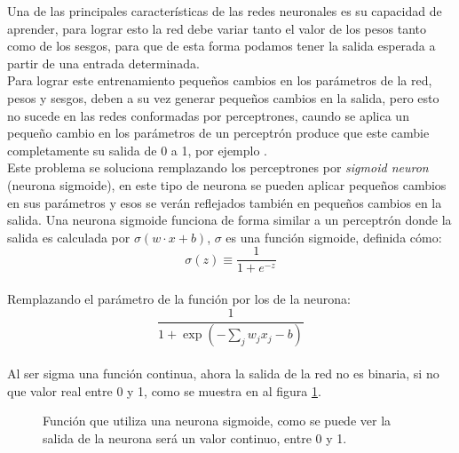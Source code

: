 \documentclass{iccmemoria}
\begin{document}
Una de las principales características de las redes neuronales es su capacidad de aprender, para lograr esto la red debe variar tanto el valor de los pesos tanto como de los sesgos, para que de esta forma podamos tener la salida esperada a partir de una entrada determinada.\\

Para lograr este entrenamiento pequeños cambios en los parámetros de la red, pesos y sesgos, deben a su vez generar pequeños cambios en la salida, pero esto no sucede en las redes conformadas por perceptrones, caundo se aplica un pequeño cambio en los parámetros de un perceptrón produce que este cambie completamente su salida de 0 a 1, por ejemplo \cite{neuralNet}.\\

Este problema se soluciona remplazando los perceptrones por \emph{sigmoid neuron} (neurona sigmoide), en este tipo de neurona se pueden aplicar pequeños cambios en sus parámetros y esos se verán reflejados también en pequeños cambios en la salida. Una neurona sigmoide funciona de forma similar a un perceptrón donde la salida es calculada por $ \sigma(w \cdot x + b)$, $\sigma$ es una función sigmoide, definida cómo:\\

\begin{equation}
	\sigma(z) \equiv \frac{1}{1+e^{-z}}
\end{equation}\\

Remplazando el parámetro de la función por los de la neurona:\\

\begin{equation} 
  \frac{1}{1+\exp(-\sum_j w_j x_j-b)}
\end{equation}\\

Al ser sigma una función continua, ahora la salida de la red no es binaria, si no que valor real entre 0 y 1, como se muestra en al figura \ref{fig:sigmoid}.\\

\begin{figure}[H]
  \centering
  \begin{small}
  
  \end{small}
  \caption[Función sigmoide.]{Función que utiliza una neurona sigmoide, como se puede ver la salida de la neurona será un valor continuo, entre 0 y 1.}
  \label{fig:sigmoid}
\end{figure}
\end{document}
